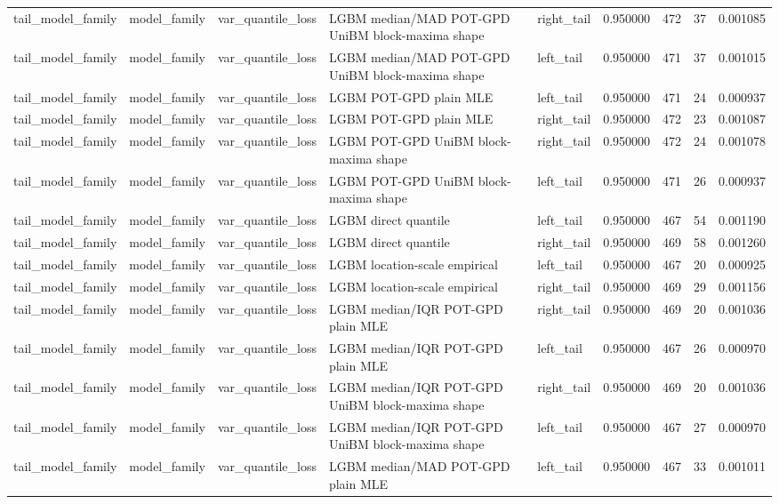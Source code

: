 \begin{tabular}{lllllrrrr}
tail\_model\_family & model\_family & var\_quantile\_loss & LGBM median/MAD POT-GPD UniBM block-maxima shape & right\_tail & 0.950000 & 472 & 37 & 0.001085 \\
tail\_model\_family & model\_family & var\_quantile\_loss & LGBM median/MAD POT-GPD UniBM block-maxima shape & left\_tail & 0.950000 & 471 & 37 & 0.001015 \\
tail\_model\_family & model\_family & var\_quantile\_loss & LGBM POT-GPD plain MLE & left\_tail & 0.950000 & 471 & 24 & 0.000937 \\
tail\_model\_family & model\_family & var\_quantile\_loss & LGBM POT-GPD plain MLE & right\_tail & 0.950000 & 472 & 23 & 0.001087 \\
tail\_model\_family & model\_family & var\_quantile\_loss & LGBM POT-GPD UniBM block-maxima shape & right\_tail & 0.950000 & 472 & 24 & 0.001078 \\
tail\_model\_family & model\_family & var\_quantile\_loss & LGBM POT-GPD UniBM block-maxima shape & left\_tail & 0.950000 & 471 & 26 & 0.000937 \\
tail\_model\_family & model\_family & var\_quantile\_loss & LGBM direct quantile & left\_tail & 0.950000 & 467 & 54 & 0.001190 \\
tail\_model\_family & model\_family & var\_quantile\_loss & LGBM direct quantile & right\_tail & 0.950000 & 469 & 58 & 0.001260 \\
tail\_model\_family & model\_family & var\_quantile\_loss & LGBM location-scale empirical & left\_tail & 0.950000 & 467 & 20 & 0.000925 \\
tail\_model\_family & model\_family & var\_quantile\_loss & LGBM location-scale empirical & right\_tail & 0.950000 & 469 & 29 & 0.001156 \\
tail\_model\_family & model\_family & var\_quantile\_loss & LGBM median/IQR POT-GPD plain MLE & right\_tail & 0.950000 & 469 & 20 & 0.001036 \\
tail\_model\_family & model\_family & var\_quantile\_loss & LGBM median/IQR POT-GPD plain MLE & left\_tail & 0.950000 & 467 & 26 & 0.000970 \\
tail\_model\_family & model\_family & var\_quantile\_loss & LGBM median/IQR POT-GPD UniBM block-maxima shape & right\_tail & 0.950000 & 469 & 20 & 0.001036 \\
tail\_model\_family & model\_family & var\_quantile\_loss & LGBM median/IQR POT-GPD UniBM block-maxima shape & left\_tail & 0.950000 & 467 & 27 & 0.000970 \\
tail\_model\_family & model\_family & var\_quantile\_loss & LGBM median/MAD POT-GPD plain MLE & left\_tail & 0.950000 & 467 & 33 & 0.001011 \\

\end{tabular}
